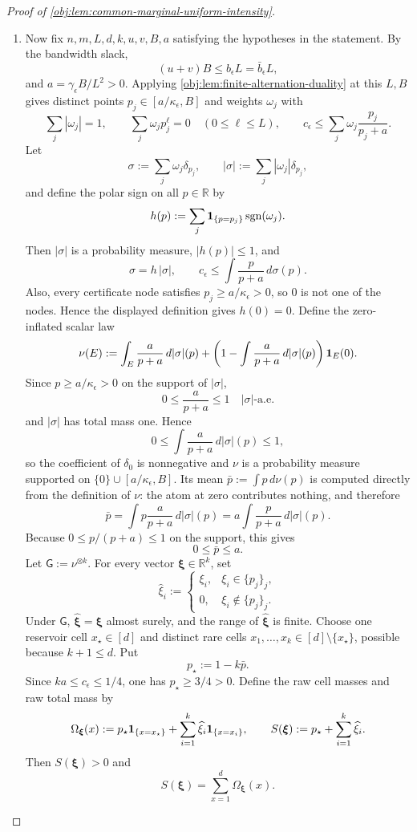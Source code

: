 \begin{proof}[Proof of \cref{obj:lem:common-marginal-uniform-intensity}]
\begin{enumerate}
\item Now fix \(n,m,L,d,k,u,v,B,a\) satisfying the hypotheses in the statement. By the bandwidth slack,
\[
(u+v)B\le b_\epsilon L=\bar b_\epsilon L,
\]
and \(a=\gamma_\epsilon B/L^2>0\). Applying \cref{obj:lem:finite-alternation-duality} at this \(L,B\) gives distinct points \(p_j\in[a/\kappa_\epsilon,B]\) and weights \(\omega_j\) with
\[
\sum_j|\omega_j|=1,\qquad
\sum_j \omega_j p_j^\ell=0\quad(0\le \ell\le L),
\qquad
c_\epsilon\le
\sum_j\omega_j\frac{p_j}{p_j+a}.
\]
Let
\[
\sigma:=\sum_j\omega_j\delta_{p_j},
\qquad
|\sigma|:=\sum_j|\omega_j|\delta_{p_j},
\]
and define the polar sign on all \(p\in\mathbb R\) by
\[
h(p):=\sum_j {\bf 1}_{\{p=p_j\}}\operatorname{sgn}(\omega_j).
\]
Then \(|\sigma|\) is a probability measure, \(|h(p)|\le1\), and
\[
\sigma=h\,|\sigma|,\qquad
c_\epsilon\le \int \frac{p}{p+a}\,d\sigma(p).
\]
Also, every certificate node satisfies \(p_j\ge a/\kappa_\epsilon>0\), so \(0\) is not one of the nodes. Hence the displayed definition gives \(h(0)=0\).
Define the zero-inflated scalar law
\[
\nu(E)
:=
\int_E \frac{a}{p+a}\,d|\sigma|(p)
+
\left(1-\int \frac{a}{p+a}\,d|\sigma|(p)\right){\bf 1}_E(0).
\]
Since \(p\ge a/\kappa_\epsilon>0\) on the support of \(|\sigma|\),
\[
0\le \frac{a}{p+a}\le 1
\quad |\sigma|\text{-a.e.}
\]
and \(|\sigma|\) has total mass one. Hence
\[
0\le \int \frac{a}{p+a}\,d|\sigma|(p)\le 1,
\]
so the coefficient of \(\delta_0\) is nonnegative and \(\nu\) is a probability measure supported on
\(\{0\}\cup[a/\kappa_\epsilon,B]\). Its mean \(\bar p:=\int p\,d\nu(p)\) is computed directly from the definition of \(\nu\): the atom at zero contributes nothing, and therefore
\[
\bar p
=
\int p\frac{a}{p+a}\,d|\sigma|(p)
=
a\int \frac{p}{p+a}\,d|\sigma|(p).
\]
Because \(0\le p/(p+a)\le1\) on the support, this gives
\[
0\le\bar p\le a .
\]
Let \(\mathsf G:=\nu^{\otimes k}\). For every vector \(\boldsymbol\xi\in\mathbb R^k\), set
\[
\widehat\xi_i
:=
\begin{cases}
\xi_i,& \xi_i\in\{p_j\}_j,\\
0,& \xi_i\notin\{p_j\}_j .
\end{cases}
\]
Under \(\mathsf G\), \(\widehat{\boldsymbol\xi}=\boldsymbol\xi\) almost surely, and the range of \(\widehat{\boldsymbol\xi}\) is finite. Choose one reservoir cell \(x_\star\in[d]\) and distinct rare cells \(x_1,\ldots,x_k\in[d]\setminus\{x_\star\}\), possible because \(k+1\le d\). Put
\[
p_\star:=1-k\bar p .
\]
Since \(k a\le c_\epsilon\le1/4\), one has \(p_\star\ge3/4>0\). Define the raw cell masses and raw total mass by
\[
\Omega_{\boldsymbol\xi}(x)
:=
p_\star{\bf 1}_{\{x=x_\star\}}
+\sum_{i=1}^k \widehat\xi_i{\bf 1}_{\{x=x_i\}},
\qquad
S(\boldsymbol\xi)
:=
p_\star+\sum_{i=1}^k\widehat\xi_i .
\]
Then \(S(\boldsymbol\xi)>0\) and
\[
S(\boldsymbol\xi)=\sum_{x=1}^d\Omega_{\boldsymbol\xi}(x).
\]


\end{enumerate}
\end{proof}
